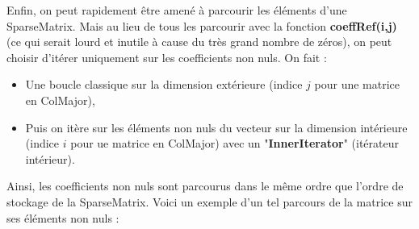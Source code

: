 \documentclass[11pt]{article}
\begin{document}
\noindent
Enfin, on peut rapidement être amené à parcourir les éléments d'une SparseMatrix. Mais au lieu de tous les parcourir avec la fonction \textbf{coeffRef(i,j)} (ce qui serait lourd et inutile à cause du très grand nombre de zéros), on peut choisir d'itérer uniquement sur les coefficients non nuls. On fait :
\begin{itemize}

\vspace{1 mm}	
	
	\item Une boucle classique sur la dimension extérieure (indice $j$ pour une matrice en ColMajor),
	
\vspace{1 mm}	
	
	\item Puis on itère sur les éléments non nuls du vecteur sur la dimension intérieure (indice $i$ pour ue matrice en ColMajor) avec un "\textbf{InnerIterator}" (itérateur intérieur).
	
\end{itemize}

\vspace{1 mm}

\noindent
Ainsi, les coefficients non nuls sont parcourus dans le même ordre que l'ordre de stockage de la SparseMatrix. Voici un exemple d'un tel parcours de la matrice sur ses éléments non nuls :

\vspace{5 mm}

\begin{center}
\end{center}
\end{document}
